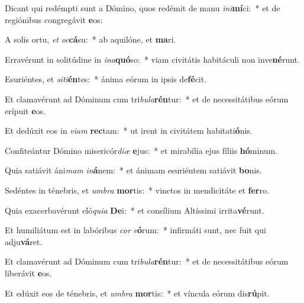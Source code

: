 \item Dicant qui redémpti sunt a Dómino, quos redémit de manu \textit{in}\textit{i}\textbf{mí}ci:~* et de regiónibus congregávit \textbf{e}os:
\item A solis ortu, \textit{et} \textit{oc}\textbf{cá}su:~* ab aquilóne, et \textbf{ma}ri.
\item Erravérunt in solitúdine in \textit{in}\textit{a}\textbf{quó}so:~* viam civitátis habitáculi non inve\textbf{né}runt.
\item Esuriéntes, et \textit{si}\textit{ti}\textbf{én}tes:~* ánima eórum in ipsis de\textbf{fé}cit.
\item Et clamavérunt ad Dóminum cum tri\textit{bu}\textit{la}\textbf{rén}tur:~* et de necessitátibus eórum erípuit \textbf{e}os.
\item Et dedúxit eos in \textit{vi}\textit{am} \textbf{rec}tam:~* ut irent in civitátem habitati\textbf{ó}nis.
\item Confiteántur Dómino misericór\textit{di}\textit{æ} \textbf{e}jus:~* et mirabília ejus fíliis \textbf{hó}minum.
\item Quia satiávit áni\textit{mam} \textit{in}\textbf{á}nem:~* et ánimam esuriéntem satiávit \textbf{bo}nis.
\item Sedéntes in ténebris, et \textit{um}\textit{bra} \textbf{mor}tis:~* vinctos in mendicitáte et \textbf{fer}ro.
\item Quia exacerbavérunt eló\textit{qui}\textit{a} \textbf{De}i:~* et consílium Altíssimi irrita\textbf{vé}runt.
\item Et humiliátum est in labóribus \textit{cor} \textit{e}\textbf{ó}rum:~* infirmáti sunt, nec fuit qui adju\textbf{vá}ret.
\item Et clamavérunt ad Dóminum cum tri\textit{bu}\textit{la}\textbf{rén}tur:~* et de necessitátibus eórum liberávit \textbf{e}os.
\item Et edúxit eos de ténebris, et \textit{um}\textit{bra} \textbf{mor}tis:~* et víncula eórum dis\textbf{rú}pit.

